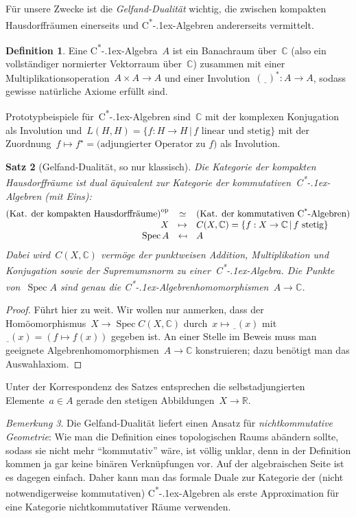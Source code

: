 \documentclass[a4paper,ngerman,12pt]{scrartcl}
\theoremstyle{definition}
\newtheorem{defn}{Definition}[section]
\theoremstyle{plain}
\newtheorem{satz}[defn]{Satz}
\theoremstyle{remark}
\newtheorem{bem}[defn]{Bemerkung}
\newcommand{\RR}{\mathbb{R}}
\newcommand{\CC}{\mathbb{C}}
\newcommand{\freist}{\underline{\ \ }}
\newcommand{\csalgebra}{C\textsuperscript{*}\kern-.1ex-Algebra}
\newcommand{\csalgebren}{C\textsuperscript{*}\kern-.1ex-Alge\-bren}
\DeclareMathOperator{\Spec}{Spec}
\newcommand{\op}{\mathrm{op}}
\renewcommand{\_}{\mathpunct{.}\,}
\newcommand{\?}{\,{:}\,}
\begin{document}
Für unsere Zwecke ist die \emph{Gelfand-Dualität} wichtig, die zwischen
kompakten Hausdorffräumen einerseits und \csalgebren{} andererseits vermittelt.
\begin{defn}Eine \csalgebra~$A$ ist ein Banachraum über~$\CC$ (also ein vollständiger
normierter Vektorraum über~$\CC$) zusammen mit einer
Multiplikationsoperation~$A \times A \to A$ und einer Involution~$(\freist)^* :
A \to A$, sodass gewisse natürliche Axiome erfüllt sind.\end{defn}
Prototypbeispiele für~\csalgebren{} sind~$\CC$ mit der komplexen Konjugation
als Involution und~$L(H,H) = \{ f : H \to H \,|\, \text{$f$ linear und stetig}
\}$ mit der Zuordnung~$f \mapsto f^\star = \text{(adjungierter Operator
zu~$f$)}$ als Involution.
\begin{satz}[Gelfand-Dualität, so nur klassisch]
Die Kategorie der kompakten Hausdorffräume ist dual äquivalent zur Kategorie
der kommutativen~\csalgebren{} (mit Eins):
\[ \begin{array}{@{}rcl@{}}
  \textnormal{(Kat. der kompakten Hausdorffräume)}^\op &\simeq&
  \textnormal{(Kat. der kommutativen \csalgebren)} \\
  X &\mapsto& C(X, \CC) = \{ f : X \to \CC \,|\, \textnormal{$f$ stetig} \} \\
  \Spec A &\mapsfrom& A
\end{array} \]
Dabei wird~$C(X, \CC)$ vermöge der punktweisen Addition, Multiplikation und
Konjugation sowie der Supremumsnorm zu einer~\csalgebra. Die Punkte von~$\Spec
A$ sind genau die \csalgebren{}homomorphismen~$A \to \CC$.
\end{satz}
\begin{proof}
Führt hier zu weit. Wir wollen nur anmerken, dass der Homöomorphismus~$X \to
\Spec C(X,\CC)$ durch~$x \longmapsto \freist(x)$ mit~$\freist(x) = (f \mapsto
f(x))$ gegeben ist. An einer Stelle im Beweis muss man geeignete
Algebrenhomomorphismen~$A \to \CC$ konstruieren; dazu benötigt man das
Auswahlaxiom.
\end{proof}

Unter der Korrespondenz des Satzes entsprechen die selbstadjungierten
Elemente~$a \in A$ gerade den stetigen Abbildungen~$X \to \RR$.

\begin{bem}Die Gelfand-Dualität liefert einen Ansatz für \emph{nichtkommutative
Geometrie}: Wie man die Definition eines topologischen Raums abändern sollte,
sodass sie nicht mehr "`kommutativ"' wäre, ist völlig unklar, denn in
der Definition kommen ja gar keine binären Verknüpfungen vor. Auf der algebraischen Seite
ist es dagegen einfach. Daher kann man das formale Duale zur Kategorie der
(nicht notwendigerweise kommutativen) \csalgebren{} als erste Approximation für
eine Kategorie nichtkommutativer Räume verwenden.
\end{bem}
\end{document}
